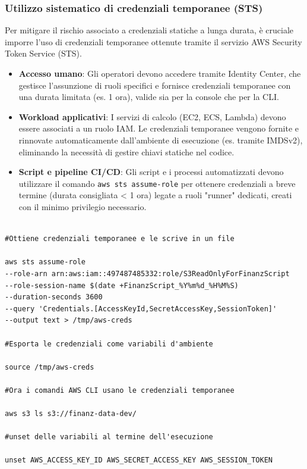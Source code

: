\subsubsection{Utilizzo sistematico di credenziali temporanee (STS)}
Per mitigare il rischio associato a credenziali statiche a lunga durata, è cruciale imporre l'uso di credenziali temporanee ottenute tramite il servizio AWS Security Token Service (STS).
\begin{itemize}
\item \textbf{Accesso umano}: Gli operatori devono accedere tramite Identity Center, che gestisce l'assunzione di ruoli specifici e fornisce credenziali temporanee con una durata limitata (es. 1 ora), valide sia per la console che per la CLI.
\item \textbf{Workload applicativi}: I servizi di calcolo (EC2, ECS, Lambda) devono essere associati a un ruolo IAM. Le credenziali temporanee vengono fornite e rinnovate automaticamente dall'ambiente di esecuzione (es. tramite IMDSv2), eliminando la necessità di gestire chiavi statiche nel codice.
\item \textbf{Script e pipeline CI/CD}: Gli script e i processi automatizzati devono utilizzare il comando \lstinline|aws sts assume-role| per ottenere credenziali a breve termine (durata consigliata < 1 ora) legate a ruoli "runner" dedicati, creati con il minimo privilegio necessario.
\end{itemize}

\begin{lstlisting}[style=bash, caption={Esempio di Assume-Role in uno script CI}, label=lst:sts-script]

#Ottiene credenziali temporanee e le scrive in un file

aws sts assume-role
--role-arn arn:aws:iam::497487485332:role/S3ReadOnlyForFinanzScript
--role-session-name $(date +FinanzScript_%Y%m%d_%H%M%S)
--duration-seconds 3600
--query 'Credentials.[AccessKeyId,SecretAccessKey,SessionToken]'
--output text > /tmp/aws-creds

#Esporta le credenziali come variabili d'ambiente

source /tmp/aws-creds

#Ora i comandi AWS CLI usano le credenziali temporanee

aws s3 ls s3://finanz-data-dev/

#unset delle variabili al termine dell'esecuzione

unset AWS_ACCESS_KEY_ID AWS_SECRET_ACCESS_KEY AWS_SESSION_TOKEN
\end{lstlisting}

